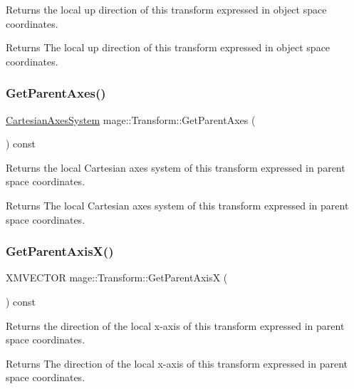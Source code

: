 Returns the local up direction of this transform expressed in object space coordinates.

\begin{DoxyReturn}{Returns}
The local up direction of this transform expressed in object space coordinates. 
\end{DoxyReturn}
\hypertarget{structmage_1_1_transform_acdd8950649ae1a779c254da82136033a}{}\label{structmage_1_1_transform_acdd8950649ae1a779c254da82136033a} 
\subsubsection{\texorpdfstring{Get\+Parent\+Axes()}{GetParentAxes()}}
{\footnotesize\ttfamily \hyperlink{structmage_1_1_cartesian_axes_system}{Cartesian\+Axes\+System} mage\+::\+Transform\+::\+Get\+Parent\+Axes (\begin{DoxyParamCaption}{ }\end{DoxyParamCaption}) const}

Returns the local Cartesian axes system of this transform expressed in parent space coordinates.

\begin{DoxyReturn}{Returns}
The local Cartesian axes system of this transform expressed in parent space coordinates. 
\end{DoxyReturn}
\hypertarget{structmage_1_1_transform_afd81bb8bef70bebc59df3ff157d53bc9}{}\label{structmage_1_1_transform_afd81bb8bef70bebc59df3ff157d53bc9} 
\subsubsection{\texorpdfstring{Get\+Parent\+Axis\+X()}{GetParentAxisX()}}
{\footnotesize\ttfamily X\+M\+V\+E\+C\+T\+OR mage\+::\+Transform\+::\+Get\+Parent\+AxisX (\begin{DoxyParamCaption}{ }\end{DoxyParamCaption}) const}

Returns the direction of the local x-\/axis of this transform expressed in parent space coordinates.

\begin{DoxyReturn}{Returns}
The direction of the local x-\/axis of this transform expressed in parent space coordinates. 
\end{DoxyReturn}
\hypertarget{structmage_1_1_transform_a973c17d7d77c742f0b6d8fbdf5041128}{}\label{structmage_1_1_transform_a973c17d7d77c742f0b6d8fbdf5041128} 

